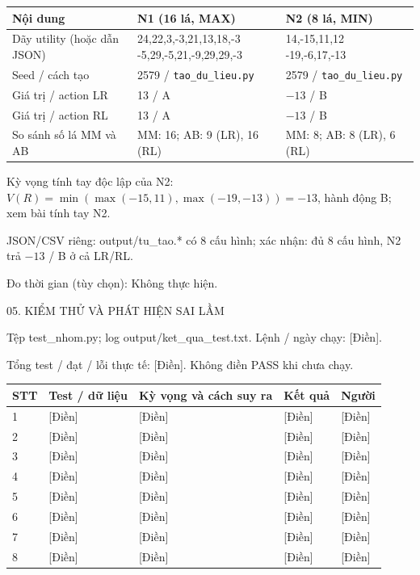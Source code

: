\documentclass[11pt,a4paper]{article}
\newcommand{\pagehead}[1]{\clearpage\begin{tcolorbox}[colback=Ink,colframe=Ink,coltext=white,fontupper=\sffamily\large\bfseries,arc=1mm]#1\end{tcolorbox}}
\begin{document}
\begingroup\footnotesize\renewcommand{\arraystretch}{1.45}\begin{tabularx}{\linewidth}{XXX}\toprule
\textbf{Nội dung} & \textbf{N1 (16 lá, MAX)} & \textbf{N2 (8 lá, MIN)}\\\midrule
Dãy utility (hoặc dẫn JSON) & \shortstack[l]{24,22,3,-3,21,13,18,-3\\-5,29,-5,21,-9,29,29,-3} & \shortstack[l]{14,-15,11,12\\-19,-6,17,-13}\\
Seed / cách tạo & 2579 / \texttt{tao\_du\_lieu.py} & 2579 / \texttt{tao\_du\_lieu.py}\\
Giá trị / action LR & 13 / A & $-13$ / B\\
Giá trị / action RL & 13 / A & $-13$ / B\\
So sánh số lá MM và AB & MM: 16; AB: 9 (LR), 16 (RL) & MM: 8; AB: 8 (LR), 6 (RL)\\
\bottomrule\end{tabularx}\endgroup\par\medskip
Kỳ vọng tính tay độc lập của N2: $V(R)=\min(\max(-15,11),\max(-19,-13))=-13$, hành động B; xem bài tính tay N2.\par JSON/CSV riêng: output/tu\_tao.* có 8 cấu hình; xác nhận: đủ 8 cấu hình, N2 trả $-13$ / B ở cả LR/RL.\par\medskip
Đo thời gian (tùy chọn): Không thực hiện.\par\medskip
\pagehead{05. KIỂM THỬ VÀ PHÁT HIỆN SAI LẦM}
Tệp test\_nhom.py; log output/ket\_qua\_test.txt. Lệnh / ngày chạy: [Điền].\par Tổng test / đạt / lỗi thực tế: [Điền]. Không điền PASS khi chưa chạy.\par\medskip
\begingroup\footnotesize\renewcommand{\arraystretch}{1.45}\begin{tabularx}{\linewidth}{p{9mm}Xp{48mm}p{21mm}p{18mm}}\toprule
\textbf{STT} & \textbf{Test / dữ liệu} & \textbf{Kỳ vọng và cách suy ra} & \textbf{Kết quả} & \textbf{Người}\\\midrule
1 & [Điền] & [Điền] & [Điền] & [Điền]\\
2 & [Điền] & [Điền] & [Điền] & [Điền]\\
3 & [Điền] & [Điền] & [Điền] & [Điền]\\
4 & [Điền] & [Điền] & [Điền] & [Điền]\\
5 & [Điền] & [Điền] & [Điền] & [Điền]\\
6 & [Điền] & [Điền] & [Điền] & [Điền]\\
7 & [Điền] & [Điền] & [Điền] & [Điền]\\
8 & [Điền] & [Điền] & [Điền] & [Điền]\\
\bottomrule\end{tabularx}\endgroup\par\medskip
\end{document}
